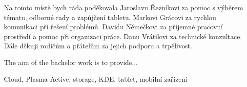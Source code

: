 \documentclass[12pt,oneside,draft]{fithesis2}
\begin{document}
  
\FrontMatter  
\ThesisTitlePage  
 
\begin{ThesisDeclaration}  
\DeclarationText  
\AdvisorName  
\end{ThesisDeclaration}  
 
\begin{ThesisThanks}  
Na tomto místě bych ráda poděkovala Jaroslavu Řezníkovi za pomoc s výběrem tématu, odborné rady a zapůjčení tabletu. Markovi Grácovi za rychlou komunikaci při řešení problémů. Davidu Němečkovi za příjemné pracovní prostředí a pomoc při organizaci práce. Danu Vrátilovi za technické konzultace. Dále děkuji rodičům a přátelům za jejich podporu a trpělivost.  
\end{ThesisThanks}  
 
\begin{ThesisAbstract}  
The aim of the bachelor work is to provide...  
\end{ThesisAbstract}  
 
\begin{ThesisKeyWords}  
Cloud, Plasma Active, storage, KDE, tablet, mobilní zařízení
\end{ThesisKeyWords}  
 
\MainMatter  
\tableofcontents          %
 









 
 
\end{document}
